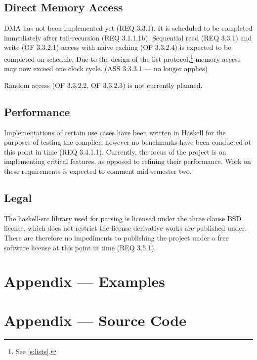 \documentclass[english,onecolumn]{article}
\begin{document}
\subsection{Direct Memory Access}
DMA has not been implemented yet (REQ 3.3.1). It is scheduled to be completed immediately after tail-recursion (REQ 3.1.1.1b). 
Sequential read (REQ 3.3.1) and write (OF 3.3.2.1) access with naive caching (OF 3.3.2.4) is expected to be completed on schedule. 
Due to the design of the list protocol,\footnote{See \ref{s:lists}.} memory access may now exceed one clock cycle. (ASS 3.3.3.1 --- no longer applies)

Random access (OF 3.3.2.2, OF 3.3.2.3) is not currently planned.

\subsection{Performance}
Implementations of certain use cases have been written in Haskell for the purposes of testing the compiler, however no benchmarks have been conducted at this point in time (REQ 3.4.1.1). Currently, the focus of the project is on implementing critical features, as opposed to refining their performance. Work on these requirements is expected to comment mid-semester two.

\subsection{Legal}
The haskell-src library used for parsing is licensed under the three clause BSD license, which does not restrict the license derivative works are published under. There are therefore no impediments to publishing the project under a free software license at this point in time (REQ 3.5.1).

\appendix
\lstset{basicstyle=\footnotesize}

\section{Appendix --- Examples}



\section{Appendix --- Source Code}








\printbibliography
\end{document}
